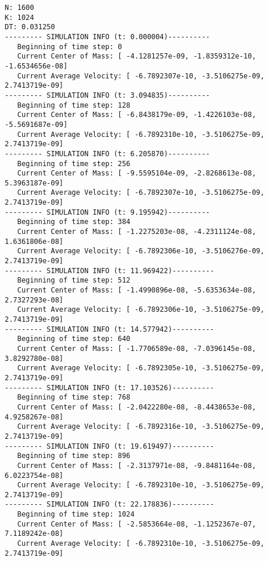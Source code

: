 \documentclass[11pt]{article}
\begin{document}
\begin{verbatim}
N: 1600
K: 1024
DT: 0.031250
--------- SIMULATION INFO (t: 0.000004)----------
   Beginning of time step: 0
   Current Center of Mass: [ -4.1281257e-09, -1.8359312e-10, -1.6534656e-08]
   Current Average Velocity: [ -6.7892307e-10, -3.5106275e-09, 2.7413719e-09]
--------- SIMULATION INFO (t: 3.094835)----------
   Beginning of time step: 128
   Current Center of Mass: [ -6.8438179e-09, -1.4226103e-08, -5.5691687e-09]
   Current Average Velocity: [ -6.7892310e-10, -3.5106275e-09, 2.7413719e-09]
--------- SIMULATION INFO (t: 6.205870)----------
   Beginning of time step: 256
   Current Center of Mass: [ -9.5595104e-09, -2.8268613e-08, 5.3963187e-09]
   Current Average Velocity: [ -6.7892307e-10, -3.5106275e-09, 2.7413719e-09]
--------- SIMULATION INFO (t: 9.195942)----------
   Beginning of time step: 384
   Current Center of Mass: [ -1.2275203e-08, -4.2311124e-08, 1.6361806e-08]
   Current Average Velocity: [ -6.7892306e-10, -3.5106276e-09, 2.7413719e-09]
--------- SIMULATION INFO (t: 11.969422)----------
   Beginning of time step: 512
   Current Center of Mass: [ -1.4990896e-08, -5.6353634e-08, 2.7327293e-08]
   Current Average Velocity: [ -6.7892306e-10, -3.5106275e-09, 2.7413719e-09]
--------- SIMULATION INFO (t: 14.577942)----------
   Beginning of time step: 640
   Current Center of Mass: [ -1.7706589e-08, -7.0396145e-08, 3.8292780e-08]
   Current Average Velocity: [ -6.7892305e-10, -3.5106275e-09, 2.7413719e-09]
--------- SIMULATION INFO (t: 17.103526)----------
   Beginning of time step: 768
   Current Center of Mass: [ -2.0422280e-08, -8.4438653e-08, 4.9258267e-08]
   Current Average Velocity: [ -6.7892316e-10, -3.5106275e-09, 2.7413719e-09]
--------- SIMULATION INFO (t: 19.619497)----------
   Beginning of time step: 896
   Current Center of Mass: [ -2.3137971e-08, -9.8481164e-08, 6.0223754e-08]
   Current Average Velocity: [ -6.7892310e-10, -3.5106275e-09, 2.7413719e-09]
--------- SIMULATION INFO (t: 22.178836)----------
   Beginning of time step: 1024
   Current Center of Mass: [ -2.5853664e-08, -1.1252367e-07, 7.1189242e-08]
   Current Average Velocity: [ -6.7892310e-10, -3.5106275e-09, 2.7413719e-09]


\end{verbatim}
\end{document}
